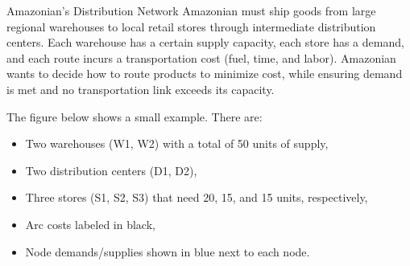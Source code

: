 \vspace{0.5em}
\begin{example}{Amazonian's Distribution Network}{}
Amazonian must ship goods from large regional warehouses to local retail stores through intermediate distribution centers. Each warehouse has a certain supply capacity, each store has a demand, and each route incurs a transportation cost (fuel, time, and labor). Amazonian wants to decide how to route products to minimize cost, while ensuring demand is met and no transportation link exceeds its capacity.

\vspace{0.5em}
The figure below shows a small example. There are:
\begin{itemize}
\item Two warehouses (W1, W2) with a total of 50 units of supply,
\item Two distribution centers (D1, D2),
\item Three stores (S1, S2, S3) that need 20, 15, and 15 units, respectively,
\item Arc costs labeled in black,
\item Node demands/supplies shown in blue next to each node.
\end{itemize}

\vspace{-1em}
\begin{center}
\end{center}
\end{example}
